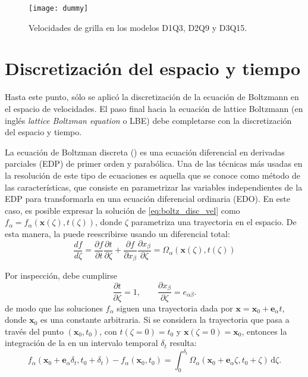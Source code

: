 \begin{figure}[ht]
	\centering
	\texttt{[image: dummy]}
	\caption{Velocidades de grilla en los modelos D1Q3, D2Q9 y D3Q15.}
	\label{fig:DdQq}
\end{figure}


\section{Discretizaci\'on del espacio y tiempo}  
Hasta este punto, s\'olo se aplic\'o la discretizaci\'on de la ecuaci\'on de Boltzmann en el espacio de velocidades. El paso final hacia la ecuaci\'on de lattice Boltzmann (en ingl\'es \emph{lattice Boltzman equation} o LBE) debe completarse con la discretizaci\'on del espacio y tiempo.
\par 
La ecuaci\'on de Boltzman discreta () es una ecuaci\'on diferencial en derivadas parciales (EDP) de primer orden y parab\'olica. Una de las t\'ecnicas m\'as usadas en la resoluci\'on de este tipo de ecuaciones es aquella que se conoce como m\'etodo de las caracter\'isticas, que consiste en parametrizar las variables independientes de la EDP para transformarla en una ecuaci\'on diferencial ordinaria (EDO). En este caso, es posible expresar la soluci\'on de \ref{eq:boltz_disc_vel} como $f_{\alpha}=f_{\alpha}(\bm{x}(\zeta),t(\zeta))$, donde $\zeta$ parametriza una trayectoria en el espacio. De esta manera, la  puede reescribirse usando un diferencial total:
\begin{equation}
	\dfrac{df}{d\zeta} = \dfrac{\partial f}{\partial t}\dfrac{\partial t}{\partial \zeta} + \dfrac{\partial f}{\partial x_{\beta}}\dfrac{\partial x_{\beta}}{\partial \zeta} = \Omega_{\alpha}(\bm{x}(\zeta),t(\zeta))
	\label{eq:zeta_total}
\end{equation}

Por inspecci\'on, debe cumplirse
\begin{equation}
	\dfrac{\partial t}{\partial \zeta} = 1, \qquad
	\dfrac{\partial x_{\beta}}{\partial \zeta} = e_{\alpha\beta}.
\end{equation}
de modo que las soluciones $f_{\alpha}$ siguen una trayectoria dada por $\bm{x}=\bm{x}_0 + \bm{e}_{\alpha}t$, donde $\bm{x}_0$ es una constante arbitraria. Si se considera la trayectoria que pasa a trav\'es del punto $(\bm{x}_0,t_0)$, con $t(\zeta=0)=t_0$ y $\bm{x}(\zeta=0)=\bm{x}_0$, entonces la integraci\'on de la  en un intervalo temporal $\delta_t$ resulta:
\begin{equation}
	f_{\alpha}(\bm{x}_0+\bm{e}_{\alpha}\delta_t,t_0+\delta_t)-f_{\alpha}(\bm{x}_0,t_0)=\int_0^{\delta_t}\Omega_{\alpha}(\bm{x}_0+\bm{e}_{\alpha}\zeta,t_0+\zeta) \, \mbox{d}\zeta.
\end{equation}

